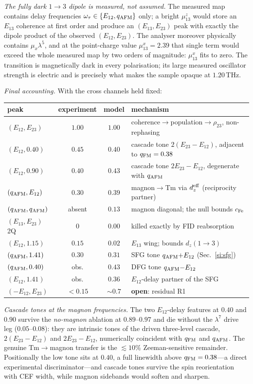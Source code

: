 \documentclass[11pt]{article}
\newcommand{\qafm}{q_{\rm AFM}}
\newcommand{\qfm}{q_{\rm FM}}
\begin{document}
\emph{The fully dark $1\!\to\!3$ dipole is measured, not assumed.}
The measured map contains delay frequencies
$\omega_\tau\in\{E_{12},\qafm\}$ only; a bright $\mu^z_{13}$ would
store an $E_{13}$ coherence at first order and produce an
$(E_{13},E_{23})$ peak with exactly the dipole product of the observed
$(E_{12},E_{23})$.  The analyser moreover physically contains
$\mu_x\lambda^5$, and at the point-charge value $\mu^x_{13}=2.39$ that
single term would exceed the whole measured map by two orders of
magnitude: $\mu^x_{13}$ fits to zero.  The transition is magnetically
dark in every polarisation; its large measured oscillator strength is
electric and is precisely what makes the sample opaque at
$1.20$\,THz.

\emph{Final accounting.}  With the cross channels held fixed:
\begin{center}\small
\renewcommand{\arraystretch}{1.2}
\begin{tabular}{lccl}
\toprule
peak & experiment & model & mechanism\\
\midrule
$(E_{12},E_{23})$ & $1.00$ & $1.00$ &
  coherence$\to$population$\to\rho_{23}$, non-rephasing\\
$(E_{12},0.40)$ & $0.45$ & $0.40$ & cascade tone
  $2(E_{23}{-}E_{12})$, adjacent to $\qfm=0.38$\\
$(E_{12},0.90)$ & $0.40$ & $0.43$ & cascade tone $2E_{23}{-}E_{12}$,
  degenerate with $\qafm$\\
$(\qafm,E_{12})$ & $0.30$ & $0.39$ & magnon$\to$Tm via
  $d_z^{\rm eff}$ (reciprocity partner)\\
$(\qafm,\qafm)$ & absent & $0.13$ & magnon diagonal; the null bounds
  $c_{\rm Fe}$\\
$(E_{13},E_{23})$ 2Q & $0$ & $0.00$ & killed exactly by FID
  reabsorption\\
$(E_{12},1.15)$ & $0.15$ & $0.02$ & $E_{13}$ wing; bounds
  $d_z(1\!\to\!3)$\\
$(\qafm,1.41)$ & $0.30$ & $0.31$ & SFG tone $\qafm{+}E_{12}$
  (Sec.~\ref{si:sfg})\\
$(\qafm,0.40)$ & obs. & $0.43$ & DFG tone $\qafm{-}E_{12}$\\
$(E_{12},1.41)$ & obs. & $0.36$ & $E_{12}$-delay partner of the SFG\\
$(-E_{12},E_{23})$ & $<0.15$ & $\sim0.7$ & \textbf{open}: residual R1\\
\bottomrule
\end{tabular}
\end{center}

\emph{Cascade tones at the magnon frequencies.}  The two
$E_{12}$-delay features at $0.40$ and $0.90$ survive the
\emph{no-magnon} ablation at $0.89$--$0.97$ and die without the
$\lambda^7$ drive leg ($0.05$--$0.08$): they are intrinsic tones of
the driven three-level cascade, $2(E_{23}{-}E_{12})$ and
$2E_{23}{-}E_{12}$, numerically coincident with $\qfm$ and $\qafm$.
The genuine Tm$\to$magnon transfer is the $\lesssim10\%$
Zeeman-sensitive remainder.  Positionally the low tone sits at
$0.40$, a full linewidth above $\qfm=0.38$---a direct experimental
discriminator---and cascade tones survive the spin reorientation with
CEF width, while magnon sidebands would soften and sharpen.
\end{document}

